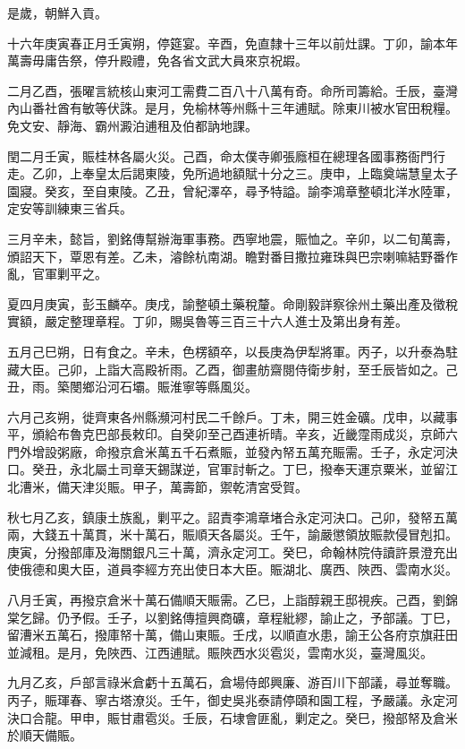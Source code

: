 \begin{pinyinscope}
是歲，朝鮮入貢。

十六年庚寅春正月壬寅朔，停筵宴。辛酉，免直隸十三年以前灶課。丁卯，諭本年萬壽毋庸告祭，停升殿禮，免各省文武大員來京祝嘏。

二月乙酉，張曜言統核山東河工需費二百八十八萬有奇。命所司籌給。壬辰，臺灣內山番社酋有敏等伏誅。是月，免榆林等州縣十三年逋賦。除東川被水官田稅糧。免文安、靜海、霸州澱泊逋租及伯都訥地課。

閏二月壬寅，賑桂林各屬火災。己酉，命太僕寺卿張廕桓在總理各國事務衙門行走。乙卯，上奉皇太后謁東陵，免所過地額賦十分之三。庚申，上臨奠端慧皇太子園寢。癸亥，至自東陵。乙丑，曾紀澤卒，尋予特謚。諭李鴻章整頓北洋水陸軍，定安等訓練東三省兵。

三月辛未，懿旨，劉銘傳幫辦海軍事務。西寧地震，賑恤之。辛卯，以二旬萬壽，頒詔天下，覃恩有差。乙未，濬餘杭南湖。瞻對番目撒拉雍珠與巴宗喇嘛結野番作亂，官軍剿平之。

夏四月庚寅，彭玉麟卒。庚戌，諭整頓土藥稅釐。命剛毅詳察徐州土藥出產及徵稅實額，嚴定整理章程。丁卯，賜吳魯等三百三十六人進士及第出身有差。

五月己巳朔，日有食之。辛未，色楞額卒，以長庚為伊犁將軍。丙子，以升泰為駐藏大臣。己卯，上詣大高殿祈雨。乙酉，御畫舫齋閱侍衛步射，至壬辰皆如之。己丑，雨。築閿鄉沿河石壩。賑淮寧等縣風災。

六月己亥朔，徙齊東各州縣瀕河村民二千餘戶。丁未，開三姓金礦。戊申，以藏事平，頒給布魯克巴部長敕印。自癸卯至己酉連祈晴。辛亥，近畿霪雨成災，京師六門外增設粥廠，命撥京倉米萬五千石煮賑，並發內帑五萬充賑需。壬子，永定河決口。癸丑，永北屬土司章天錫謀逆，官軍討斬之。丁巳，撥奉天運京粟米，並留江北漕米，備天津災賑。甲子，萬壽節，禦乾清宮受賀。

秋七月乙亥，鎮康土族亂，剿平之。詔責李鴻章堵合永定河決口。己卯，發帑五萬兩，大錢五十萬貫，米十萬石，賑順天各屬災。壬午，諭嚴懲領放賑款侵冒剋扣。庚寅，分撥部庫及海關銀凡三十萬，濟永定河工。癸巳，命翰林院侍讀許景澄充出使俄德和奧大臣，道員李經方充出使日本大臣。賑湖北、廣西、陜西、雲南水災。

八月壬寅，再撥京倉米十萬石備順天賑需。乙巳，上詣醇親王邸視疾。己酉，劉錦棠乞歸。仍予假。壬子，以劉銘傳擅興商礦，章程紕繆，諭止之，予部議。丁巳，留漕米五萬石，撥庫帑十萬，備山東賑。壬戌，以順直水患，諭王公各府京旗莊田並減租。是月，免陜西、江西逋賦。賑陜西水災雹災，雲南水災，臺灣風災。

九月乙亥，戶部言祿米倉虧十五萬石，倉場侍郎興廉、游百川下部議，尋並奪職。丙子，賑琿春、寧古塔潦災。壬午，御史吳兆泰請停頤和園工程，予嚴議。永定河決口合龍。甲申，賑甘肅雹災。壬辰，石埭會匪亂，剿定之。癸巳，撥部帑及倉米於順天備賑。


\end{pinyinscope}
